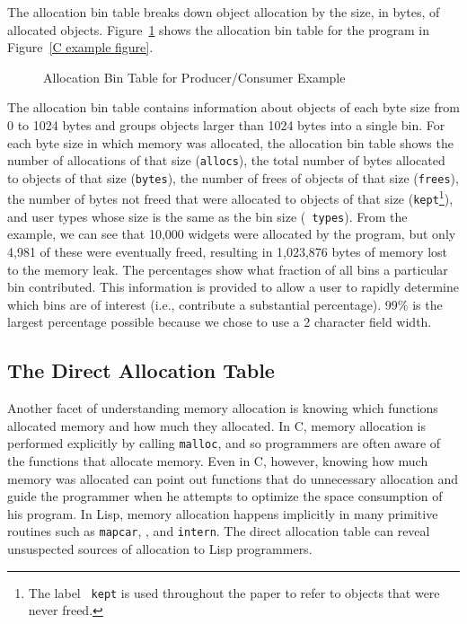 The allocation bin table breaks down object allocation by the size, in
bytes, of allocated objects.  Figure~\ref{allocation bin figure} shows
the allocation bin table for the program in Figure~\ref{C example
figure}.

\begin{figure}[htbp]
\begin{singlespace}
{

}
\end{singlespace}
\caption{Allocation Bin Table for Producer/Consumer Example}
\label{allocation bin figure}
\end{figure}

The allocation bin table contains information about objects of each
byte size from 0 to 1024 bytes and groups objects larger than 1024
bytes into a single bin.  For each byte size in which memory was
allocated, the allocation bin table shows the number of allocations of
that size ({\tt allocs}), the total number of bytes allocated to
objects of that size ({\tt bytes}), the number of frees of objects of
that size ({\tt frees}), the number of bytes not freed that were
allocated to objects of that size ({\tt kept}\footnote{The label {\tt
kept} is used throughout the paper to refer to objects that were never
freed.}), and user types whose size is the same as the bin size ({\tt
types}).  From the example, we can see that 10,000 widgets were
allocated by the program, but only 4,981 of these were eventually
freed, resulting in 1,023,876 bytes of memory lost to the memory leak.
The percentages show what fraction of all bins a particular bin
contributed.  This information is provided to allow a user to rapidly
determine which bins are of interest (i.e., contribute a substantial
percentage).  99\% is the largest percentage possible because we chose
to use a 2 character field width.

\subsection{The Direct Allocation Table}

Another facet of understanding memory allocation is knowing which
functions allocated memory and how much they allocated.  In C, memory
allocation is performed explicitly by calling {\tt malloc}, and so
programmers are often aware of the functions that allocate memory.
Even in C, however, knowing how much memory was allocated can point
out functions that do unnecessary allocation and guide the programmer
when he attempts to optimize the space consumption of his program.  In
Lisp, memory allocation happens implicitly in many primitive routines
such as {\tt mapcar}, {\tt *}, and {\tt intern}. The direct allocation
table can reveal unsuspected sources of allocation to Lisp
programmers.

